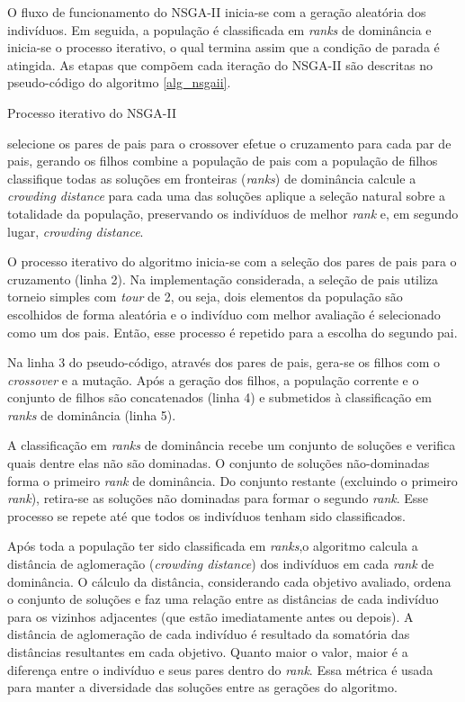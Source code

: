 O fluxo de funcionamento do NSGA-II inicia-se com a geração aleatória dos indivíduos. Em seguida, a população é classificada em \textit{ranks} de dominância e inicia-se o processo iterativo, o qual termina assim que a condição de parada é atingida. As etapas que compõem cada iteração do NSGA-II são descritas no pseudo-código do algoritmo \ref{alg_nsgaii}.

\begin{algorithm}
	\caption{Processo iterativo do NSGA-II}
	\label{alg_nsgaii}
	\begin{algorithmic}[1]
		\State selecione os pares de pais para o crossover
		\State efetue o cruzamento para cada par de pais, gerando os filhos
		\State combine a população de pais com a população de filhos
		\State classifique todas as soluções em fronteiras (\textit{ranks}) de dominância 
		\State calcule a \textit{crowding distance} para cada uma das soluções
		\State aplique a seleção natural sobre a totalidade da população, preservando os indivíduos de melhor \textit{rank} e, em segundo lugar, \textit{crowding distance}.
		\EndWhile
	\end{algorithmic}
\end{algorithm}

O processo iterativo do algoritmo inicia-se com a seleção dos pares de pais para o cruzamento (linha 2). Na implementação considerada, a seleção de pais utiliza torneio simples com \textit{tour} de 2, ou seja, dois elementos da população são escolhidos de forma aleatória e o indivíduo com melhor avaliação é selecionado como um dos pais. Então, esse processo é repetido para a escolha do segundo pai.

Na linha 3 do pseudo-código, através dos pares de pais, gera-se os filhos com o \textit{crossover} e a mutação. Após a geração dos filhos, a população corrente e o conjunto de filhos são concatenados (linha 4) e submetidos à classificação em \textit{ranks} de dominância (linha 5).

A classificação em \textit{ranks} de dominância recebe um conjunto de soluções e verifica quais dentre elas não são dominadas. O conjunto de soluções não-dominadas forma o primeiro \textit{rank} de dominância. Do conjunto restante (excluindo o primeiro \textit{rank}), retira-se as soluções não dominadas para formar o segundo \textit{rank}. Esse processo se repete até que todos os indivíduos tenham sido classificados.

Após toda a população ter sido classificada em \textit{ranks},o algoritmo calcula a distância de aglomeração (\textit{crowding distance}) dos indivíduos em cada \textit{rank} de dominância. O cálculo da distância, considerando cada objetivo avaliado, ordena o conjunto de soluções e faz uma relação entre as distâncias de cada indivíduo para os vizinhos adjacentes (que estão imediatamente antes ou depois). A distância de aglomeração de cada indivíduo é resultado da somatória das distâncias resultantes em cada objetivo.  Quanto maior o valor, maior é a diferença entre o indivíduo e seus pares dentro do \textit{rank}. Essa métrica é usada para manter a diversidade das soluções entre as gerações do algoritmo.

